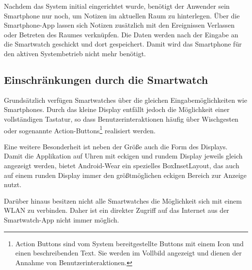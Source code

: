 Nachdem das System initial eingerichtet wurde, benötigt der Anwender sein Smartphone nur noch, um Notizen im aktuellen Raum zu hinterlegen. Über die Smartphone-App lassen sich Notizen zusätzlich mit den Ereignissen Verlassen oder Betreten des Raumes verknüpfen. Die Daten werden nach der Eingabe an die Smartwatch geschickt und dort gespeichert. Damit wird das Smartphone für den aktiven Systembetrieb nicht mehr benötigt.

\subsection{Einschränkungen durch die Smartwatch}
\label{sec:einschraenkungen}
Grundsätzlich verfügen Smartwatches über die gleichen Eingabemöglichkeiten wie Smartphones. Durch das kleine Display entfällt jedoch die Möglichkeit einer vollständigen Tastatur, so dass Benutzerinteraktionen häufig über Wischgesten oder sogenannte Action-Buttons\footnote{Action Buttons sind vom System bereitgestellte Buttons mit einem Icon und einen beschreibenden Text. Sie werden im Vollbild angezeigt und dienen der Annahme von Benutzerinteraktionen.} realisiert werden. 

Eine weitere Besonderheit ist neben der Größe auch die Form des Displays. Damit die Applikation auf Uhren mit eckigen und rundem Display jeweils gleich angezeigt werden, bietet Android-Wear ein spezielles BoxInsetLayout, das auch auf einem runden Display immer den größtmöglichen eckigen Bereich zur Anzeige nutzt.

Darüber hinaus besitzen nicht alle Smartwatches die Möglichkeit sich mit einem WLAN zu verbinden. Daher ist ein direkter Zugriff auf das Internet aus der Smartwatch-App nicht immer möglich.
